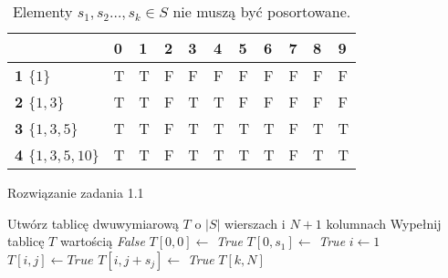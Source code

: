 \begin{table}[H]
	\center
	\begin{tabular}{|l|l|l|l|l|l|l|l|l|l|l|}
		\hline
		& \multicolumn{1}{l|}{\textbf{0}} & \multicolumn{1}{l|}{\textbf{1}} & \multicolumn{1}{l|}{\textbf{2}} & \multicolumn{1}{l|}{\textbf{3}} & \multicolumn{1}{l|}{\textbf{4}} & \multicolumn{1}{l|}{\textbf{5}} & \multicolumn{1}{l|}{\textbf{6}} & \multicolumn{1}{l|}{\textbf{7}} & \multicolumn{1}{l|}{\textbf{8}} & \multicolumn{1}{l|}{\textbf{9}} \\ \hline
		\textbf{1 $\{1\}$} & \color{ForestGreen}T & \color{ForestGreen}T & F & F & F & F & F & F & F & F \\ \cline{1-1}
		\textbf{2 $\{1, 3\}$} & \color{ForestGreen}T & \color{ForestGreen}T & F & \color{ForestGreen}T & \color{ForestGreen}T & F & F & F & F & F \\ \cline{1-1}
		\textbf{3 $\{1, 3, 5\}$} & \color{ForestGreen}T & \color{ForestGreen}T & F & \color{ForestGreen}T & \color{ForestGreen}T & \color{ForestGreen}T & \color{ForestGreen}T & F & \color{ForestGreen}T & \color{ForestGreen}T \\ \cline{1-1}
		\textbf{4 $\{1, 3, 5, 10\}$} & \color{ForestGreen}T & \color{ForestGreen}T & F & \color{ForestGreen}T & \color{ForestGreen}T & \color{ForestGreen}T & \color{ForestGreen}T & F & \color{ForestGreen}T & \color{ForestGreen}T  \\ \cline{1-1}
		\hline
	\end{tabular}
	\caption{Elementy $s_1, s_2 \dots, s_k \in S$ nie muszą być posortowane.}
\end{table}

\begin{algorithm}[H]
	\caption{Rozwiązanie zadania 1.1}\label{Zadanie11}
	\begin{algorithmic}[1]
		\State Utwórz tablicę dwuwymiarową $T$ o $|S|$ wierszach i $N + 1$ kolumnach 
		\State Wypełnij tablicę $T$ wartością \textit{False}
		\State $T[0, 0] \gets $ \textit{True}
		\State $T[0, s_1] \gets $ \textit{True}
		\State $i \gets 1$
		\State $T[i, j] \gets \textit{True}$
		\State $T[i, j + s_j] \gets$ \textit{True}
		\EndIf
		\EndIf
		\EndFor 
		\EndFor
		\State \Return $T[k, N]$
		\EndProcedure 
	\end{algorithmic}
\end{algorithm}

